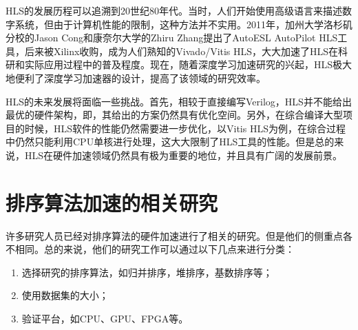 HLS的发展历程可以追溯到20世纪80年代。当时，人们开始使用高级语言来描述数字系统，但由于计算机性能的限制，这种方法并不实用。2011年，加州大学洛杉矶分校的Jason Cong和康奈尔大学的Zhiru Zhang提出了AutoESL AutoPilot HLS工具\cite{cong2011high}，后来被Xilinx收购，成为人们熟知的Vivado/Vitis HLS，大大加速了HLS在科研和实际应用过程中的普及程度。\cite{hlsbook}\cite{pp4fpgas}现在，随着深度学习加速研究的兴起，HLS极大地便利了深度学习加速器的设计，提高了该领域的研究效率。

HLS的未来发展将面临一些挑战。首先，相较于直接编写Verilog，HLS并不能给出最优的硬件架构，即，其给出的方案仍然具有优化空间。另外，在综合编译大型项目的时候，HLS软件的性能仍然需要进一步优化，以Vitis HLS为例，在综合过程中仍然只能利用CPU单核进行处理，这大大限制了HLS工具的性能。\cite{cong2022fpga}但是总的来说，HLS在硬件加速领域仍然具有极为重要的地位，并且具有广阔的发展前景。


\section{排序算法加速的相关研究}

许多研究人员已经对排序算法的硬件加速进行了相关的研究。但是他们的侧重点各不相同。总的来说，他们的研究工作可以通过以下几点来进行分类：
\begin{enumerate}
    \item 选择研究的排序算法，如归并排序，堆排序，基数排序等；
    \item 使用数据集的大小；
    \item 验证平台，如CPU、GPU、FPGA等。
\end{enumerate}


